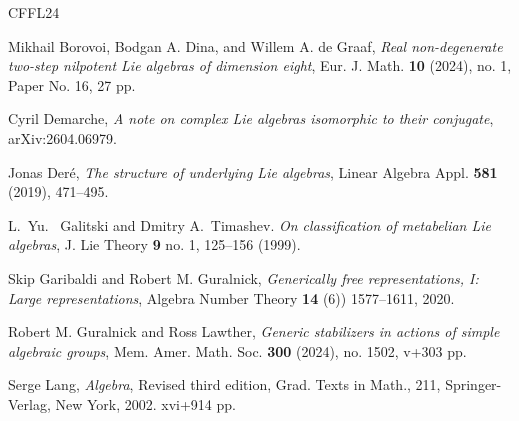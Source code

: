 \documentclass[11pt]{amsart}
\theoremstyle{plain}
\theoremstyle{definition}
\newcommand{\C}{{\mathds C}}
\newcommand{\Id}{{\rm Id}}
\newcommand{\PP}{\mathbb{P}}
\newcommand{\TT}{{\sf T}}
\begin{document}

\begin{thebibliography}{CFFL24}


Mikhail Borovoi, Bodgan A. Dina, and Willem A. de Graaf,
{\em Real non-degenerate two-step nilpotent Lie algebras of dimension eight},
Eur. J. Math. {\bf 10} (2024), no. 1, Paper No. 16, 27 pp.

Cyril Demarche,
{\em A note on complex Lie algebras isomorphic to their conjugate},
arXiv:2604.06979.

Jonas Deré,
{\em The structure of underlying Lie algebras},
Linear Algebra Appl. {\bf 581} (2019), 471--495.

L.~Yu.~ Galitski and Dmitry A.~Timashev.
{\em  On classification of metabelian Lie algebras},
J. Lie Theory {\bf 9} no. 1, 125--156 (1999).

 Skip Garibaldi and Robert M.  Guralnick, {\em Generically free
representations, I: Large representations},
Algebra Number Theory {\bf 14} (6)) 1577--1611, 2020.

Robert M. Guralnick and Ross Lawther,
{\em Generic stabilizers in actions of simple algebraic groups},
Mem. Amer. Math. Soc. {\bf 300} (2024), no. 1502, v+303 pp.


Serge Lang,
{\em Algebra},
Revised third edition,
Grad. Texts in Math., 211,
Springer-Verlag, New York, 2002. xvi+914 pp.

\end{thebibliography}
\end{document}
